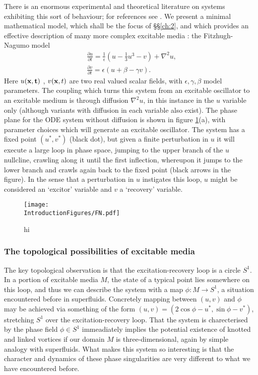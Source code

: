 There is an enormous experimental and theoretical literature on systems exhibiting this sort of behaviour; for references see \citep{WinfreeBook}. We present a minimal mathematical model, which shall be the focus of \S\S\ref{ch:2}, and which provides an effective description of many more complex excitable media \citep{WinfreeBook}: the Fitzhugh-Nagumo model \citep{FitzHugh1961,Nagumo1962}
\begin{eqnarray}
&\frac{\partial u}{\partial t}= \frac{1}{\epsilon}(u - \frac{1}{3} u^3 - v) + \nabla^2 u, \\
&\frac{\partial v}{\partial t} = {\epsilon}(u + \beta - \gamma v).
\label{eq:FN}
\end{eqnarray}
Here $u(\bf {x} ,t)$ , $v({\bf x},t)$ are two real valued scalar fields, with $\epsilon,\gamma,\beta$ model parameters. The coupling which turns this system from an excitable oscillator to an excitable medium is through diffusion $\nabla^2 u$, in this instance in the $u$ variable only (although variants with diffusion in each variable also exist). The phase plane for the ODE system without diffusion is shown in figure \ref{fig:FN}(a), with parameter choices which will generate an excitable oscillator. The system has a fixed  point $(u^*,v^*)$ (black dot), but given a finite perturbation in $u$ it will execute a large loop in phase space, jumping to the upper branch of the $u$ nullcline, crawling along it until the first inflection, whereupon it jumps to the lower branch and crawls again back to the fixed point (black arrows in the figure). In the sense that a perturbation in $u$ instigates this loop, $u$ might be considered an `excitor' variable and $v$ a `recovery' variable.
\begin{figure}[htbp]
\centering
\texttt{[image: \\IntroductionFigures/FN.pdf]}
\caption{hi }
\label{fig:FN}
\end{figure}

\subsubsection{The topological possibilities of excitable media}

The key topological observation is that the excitation-recovery loop is a circle $S^1$. In a portion of excitable media $M$, the state of a typical point lies somewhere on this loop, and thus we can describe the system with a map $\phi : M \rightarrow S^1$, a situation encountered before in superfluids. Concretely mapping between $(u,v)$ and $\phi$ may be achieved via something of the form $(u,v) = (2 \cos \phi - u^*, \sin \phi - v^*)$, stretching $S^1$ over the excitation-recovery loop. That the system is charecterised by the phase field $\phi \in S^1$ immeadiately implies the potential existence of knotted and linked vortices if our domain $M$ is three-dimensional, again by simple analogy with superfluids. What makes this system so interesting is that the character and dynamics of these phase singularities are very different to what we have encountered before. 

